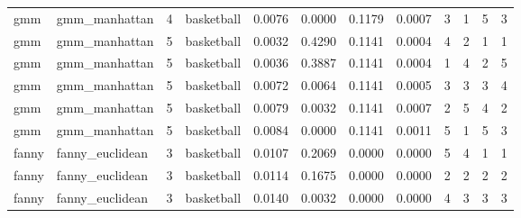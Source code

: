 \documentclass[
]{article}
\begin{document}
\begin{longtable}{| p{1.1cm} | p{2cm} | p{0.8cm} | p{1.3cm} | p{0.60cm} | p{0.7cm} | p{0.65cm} | p{0.65cm} | p{0.65cm} | p{0.65cm} | p{0.7cm} | p{0.65cm} |}
\scriptsize     gmm   & \scriptsize    gmm\_manhattan & \scriptsize    4    & \scriptsize basketball & \scriptsize    0.0076  &  \scriptsize 0.0000 & \scriptsize 0.1179 & \scriptsize    0.0007 & \scriptsize   3  & \scriptsize    1  & \scriptsize    5  & \scriptsize    3 \\
\cline{3-12}
\rowcolor{green} \scriptsize     gmm   & \scriptsize    gmm\_manhattan & \scriptsize    5    & \scriptsize basketball & \scriptsize    0.0032  &  \scriptsize 0.4290 & \scriptsize 0.1141 & \scriptsize    0.0004 & \scriptsize   4  & \scriptsize    2  & \scriptsize    1  & \scriptsize    1 \\
\scriptsize     gmm   & \scriptsize    gmm\_manhattan & \scriptsize    5    & \scriptsize basketball & \scriptsize    0.0036  &  \scriptsize 0.3887 & \scriptsize 0.1141 & \scriptsize    0.0004 & \scriptsize   1  & \scriptsize    4  & \scriptsize    2  & \scriptsize    5 \\
\scriptsize     gmm   & \scriptsize    gmm\_manhattan & \scriptsize    5    & \scriptsize basketball & \scriptsize    0.0072  &  \scriptsize 0.0064 & \scriptsize 0.1141 & \scriptsize    0.0005 & \scriptsize   3  & \scriptsize    3  & \scriptsize    3  & \scriptsize    4 \\
\scriptsize     gmm   & \scriptsize    gmm\_manhattan & \scriptsize    5    & \scriptsize basketball & \scriptsize    0.0079  &  \scriptsize 0.0032 & \scriptsize 0.1141 & \scriptsize    0.0007 & \scriptsize   2  & \scriptsize    5  & \scriptsize    4  & \scriptsize    2 \\
\scriptsize     gmm   & \scriptsize    gmm\_manhattan & \scriptsize    5    & \scriptsize basketball & \scriptsize    0.0084  &  \scriptsize 0.0000 & \scriptsize 0.1141 & \scriptsize    0.0011 & \scriptsize   5  & \scriptsize    1  & \scriptsize    5  & \scriptsize    3 \\
\cline{1-12}
\scriptsize   fanny   & \scriptsize  fanny\_euclidean & \scriptsize    3    & \scriptsize basketball & \scriptsize    0.0107  &  \scriptsize 0.2069 & \scriptsize 0.0000 & \scriptsize    0.0000 & \scriptsize   5  & \scriptsize    4  & \scriptsize    1  & \scriptsize    1 \\
\scriptsize   fanny   & \scriptsize  fanny\_euclidean & \scriptsize    3    & \scriptsize basketball & \scriptsize    0.0114  &  \scriptsize 0.1675 & \scriptsize 0.0000 & \scriptsize    0.0000 & \scriptsize   2  & \scriptsize    2  & \scriptsize    2  & \scriptsize    2 \\
\scriptsize   fanny   & \scriptsize  fanny\_euclidean & \scriptsize    3    & \scriptsize basketball & \scriptsize    0.0140  &  \scriptsize 0.0032 & \scriptsize 0.0000 & \scriptsize    0.0000 & \scriptsize   4  & \scriptsize    3  & \scriptsize    3  & \scriptsize    3 \\

\end{longtable}
\end{document}

